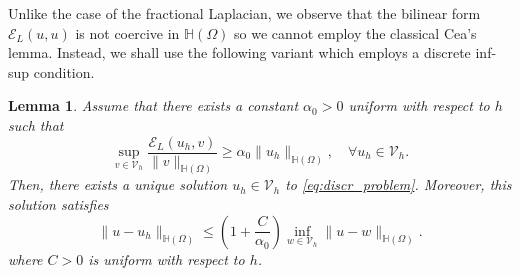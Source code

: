 \documentclass[11 pt]{article}
\newtheorem{lemma}[theorem]{Lemma}
\numberwithin{equation}{section}
\def\cE{\mathcal{E}}
\begin{document}
Unlike the case of the fractional Laplacian, we observe that the bilinear form $\cE_{L}(u,u)$ is not coercive in $\mathbb H(\Omega)$ so we cannot employ the classical Cea's lemma. Instead, we shall use the following variant which employs a discrete inf-sup condition. 
%
\begin{lemma}\label{lem:cea_mg}
Assume that there exists a constant $\alpha_0>0$ uniform with respect to $h$ such that
%
\begin{equation}\label{eq:discr_inf_sup}
    \sup_{v\in \mathcal V_h}\frac{\cE_{L}(u_h,v)}{\|v\|_{\mathbb H(\Omega)}}\geq \alpha_0\|u_h\|_{\mathbb H(\Omega)}, \quad\forall u_h\in\mathcal V_h.
\end{equation}
%
Then, there exists a unique solution $u_h\in \mathcal V_h$ to \eqref{eq:discr_problem}. Moreover, this solution satisfies
%
\begin{equation}\label{eq:stability_cea}
    \|u-u_h\|_{\mathbb H(\Omega)}\leq \left(1+\frac{C}{\alpha_0}\right)\inf_{w\in\mathcal V_h}\|u-w\|_{\mathbb H(\Omega)}.
\end{equation}
%
where $C>0$ is uniform with respect to $h$.
\end{lemma}
%
\end{document}

